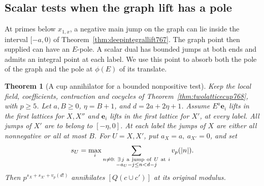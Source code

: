 \documentclass[a4paper,11pt]{article}
\newtheorem{theorem}[proposition]{Theorem}
\theoremstyle{definition}
\theoremstyle{remark}
\numberwithin{equation}{section}
\begin{document}
\subsection{Scalar tests when the graph lift has a pole}
\label{sec:scalarcupall770}
At primes below \(x_{1,x}\), a negative main jump on the
graph can lie inside the interval \([-a,0)\) of
Theorem~\ref{thm:deepintegrallift767}. The graph point
then supplied can have an \(E\)-pole. A scalar dual has
bounded jumps at both ends and admits an integral point
at each label. We use this point to absorb both the pole
of the graph and the pole at \(\phi(E)\) of its translate.

\begin{theorem}[A cup annihilator for a bounded nonpositive test]
\leavevmode\label{thm:scalarmeromorphic770}
Keep the local field, coefficients, contraction and cocycles
of Theorem~\ref{thm:twolatticecup768}, with \(p\ge5\).
Let \(a,B\ge0\), \(\eta=B+1\), and \(d=2a+2\eta+1\).
Assume \(E^a\mathbf e_i\) lifts in the first lattices for
\(X,X''\) and \(\mathbf e_i\) lifts in the first lattice
for \(X'\), at every label. All jumps of \(X'\) are to
belong to \([-\eta,0]\). At each label the jumps of \(X\)
are either all nonnegative or all at most \(B\).
For \(U=X,X'\), put \(a_X=a,\ a_{X'}=0\), and set
\[
 s_U=\max_i\sum_{\substack{n\ne0:\ \exists\,j\ {\rm a\ jump\
              of}\ U\ {\rm at}\ i\\-a_U-j\le n<d-j}}v_p(|n|).
\]
Then \(p^{s_X+s_{X'}+v_p(d!)}\) annihilates
\([Q(c\cup c')]\) at its original modulus.
\end{theorem}
\end{document}
